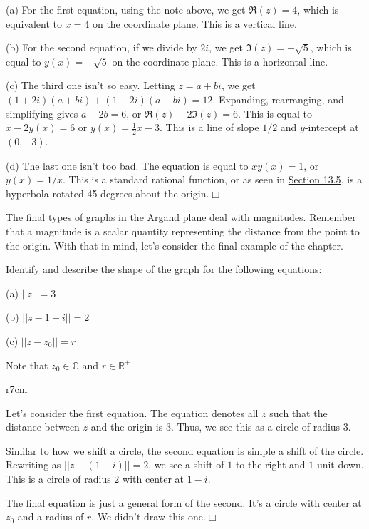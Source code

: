 \documentclass[../book.tex]{subfiles}
\begin{document}
\begin{solution}

(a) For the first equation, using the note above, we get $\Re(z)=4$, which is equivalent to $x=4$ on the coordinate plane.  This is a vertical line.

(b) For the second equation, if we divide by $2i$, we get $\Im(z)=-\sqrt{5}$, which is equal to $y(x)=-\sqrt{5}$ on the coordinate plane.  This is a horizontal line.

(c) The third one isn't so easy.  Letting $z=a+bi$, we get $(1+2i)(a+bi)+(1-2i)(a-bi)=12$.  Expanding, rearranging, and simplifying gives $a-2b=6$, or $\Re(z)-2\Im(z)=6$.  This is equal to $x-2y(x)=6$ or $\displaystyle y(x)=\frac{1}{2}x-3$.  This is a line of slope $1/2$ and $y$-intercept at $(0,-3)$.

(d) The last one isn't too bad.  The equation is equal to $xy(x)=1$, or $y(x)=1/x$.  This is a standard rational function, or as seen in \hyperlink{section.13.5}{Section 13.5}, is a hyperbola rotated 45 degrees about the origin.$\Box$
\end{solution}
\noindent The final types of graphs in the Argand plane deal with magnitudes.  Remember that a magnitude is a scalar quantity representing the distance from the point to the origin.  With that in mind, let's consider the final example of the chapter.
\newpage
\begin{example}
Identify and describe the shape of the graph for the following equations: 

(a) $||z||=3$

(b) $||z-1+i||=2$

(c) $||z-z_0||=r$

Note that $z_0\in\mathbb{C}$ and $r\in\mathbb{R}^+$.
\end{example}
\begin{wrapfigure}{r}{7cm}
    \centering
{}
\end{wrapfigure}
\begin{solution}
Let's consider the first equation.  The equation denotes all $z$ such that the distance between $z$ and the origin is $3$.  Thus, we see this as a circle of radius $3$.

Similar to how we shift a circle, the second equation is simple a shift of the circle.  Rewriting as $||z-(1-i)||=2$, we see a shift of $1$ to the right and $1$ unit down.  This is a circle of radius $2$ with center at $1-i$.

The final equation is just a general form of the second.  It's a circle with center at $z_0$ and a radius of $r$.  We didn't draw this one.$\Box$
\end{solution}
\end{document}
